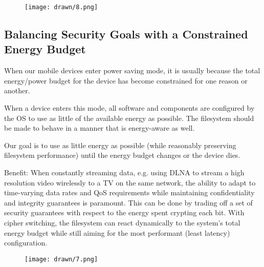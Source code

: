 
\begin{figure}[ht]
 \centering
  \texttt{[image: drawn/8.png]}
   \caption{}\label{fig:mirrored-vs-selective}
\end{figure}

\subsection{Balancing Security Goals with a Constrained Energy Budget}

When our mobile devices enter power saving mode, it is usually because the total
energy/power budget for the device has become constrained for one reason or
another.

When a device enters this mode, all software and components are configured by
the OS to use as little of the available energy as possible. The filesystem
should be made to behave in a manner that is energy-aware as well.

Our goal is to use as little energy as possible (while reasonably preserving
filesystem performance) until the energy budget changes or the device dies.

Benefit: When constantly streaming data, e.g. using DLNA to stream a high
resolution video wirelessly to a TV on the same network, the ability to adapt to
time-varying data rates and QoS requirements while maintaining confidentiality
and integrity guarantees is paramount. This can be done by trading off a set of
security guarantees with respect to the energy spent crypting each bit. With
cipher switching, the filesystem can react dynamically to the system's total
energy budget while still aiming for the most performant (least latency)
configuration.


\begin{figure}[ht]
 \centering
  \texttt{[image: drawn/7.png]}
   \caption{}\label{fig:energy-budget}
\end{figure}

